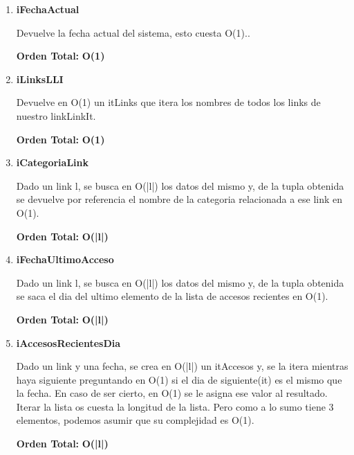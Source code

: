 \begin{enumerate}

\item\textbf{iFechaActual}
\par Devuelve la fecha actual del sistema, esto cuesta O(1)..
\par\textbf{Orden Total:} \textbf{O(1)}

\item\textbf{iLinksLLI}
\par Devuelve en O(1) un itLinks que itera los nombres de todos los links de nuestro linkLinkIt.
\par\textbf{Orden Total:} \textbf{O(1)}

\item\textbf{iCategoriaLink}
\par Dado un link l, se busca en O(|l|) los datos del mismo y, de la tupla obtenida se devuelve por referencia el nombre de la categoria relacionada a ese link en O(1).
\par\textbf{Orden Total:} \textbf{O(|l|)}

\item\textbf{iFechaUltimoAcceso}
\par Dado un link l, se busca en O(|l|) los datos del mismo y, de la tupla obtenida se saca el dia del ultimo elemento de la lista de accesos recientes en O(1).
\par\textbf{Orden Total:} \textbf{O(|l|)}

\item\textbf{iAccesosRecientesDia}
\par Dado un link y una fecha, se crea en O(|l|) un itAccesos y, se la itera mientras haya siguiente preguntando en O(1) si el dia de siguiente(it) es el mismo que la fecha. En caso de ser cierto, en O(1) se le asigna ese valor al resultado. Iterar la lista os cuesta la longitud de la lista. Pero como a lo sumo tiene 3 elementos, podemos asumir que su complejidad es O(1).
\par\textbf{Orden Total:} \textbf{O(|l|)}


\end{enumerate}
